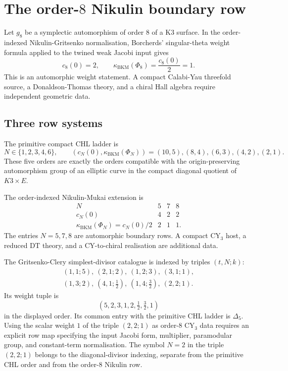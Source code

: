 \providecommand{\ZZ}{\mathbb{Z}}
\providecommand{\CC}{\mathbb{C}}
\providecommand{\cO}{\mathcal{O}}
\providecommand{\Kum}{\mathrm{Kum}}
\providecommand{\DT}{\mathrm{DT}}
\providecommand{\Eone}{E_1}
\providecommand{\Etwo}{E_2}
\providecommand{\kBKM}{\kappa_{\mathrm{BKM}}}
\providecommand{\kch}{\kappa_{\mathrm{ch}}}
\providecommand{\kcat}{\kappa_{\mathrm{cat}}}
\providecommand{\kfib}{\kappa_{\mathrm{fiber}}}
\providecommand{\PhiN}{\Phi_N}

\section*{The order-$8$ Nikulin boundary row}

Let $g_8$ be a symplectic automorphism of order $8$ of a K3 surface.
In the order-indexed Nikulin-Gritsenko normalisation, Borcherds'
singular-theta weight formula applied to the twined weak Jacobi input
gives
\[
  c_8(0)=2,\qquad \kBKM(\Phi_8)=\frac{c_8(0)}{2}=1.
\]
This is an automorphic weight statement. A compact Calabi-Yau threefold
source, a Donaldson-Thomas theory, and a chiral Hall algebra require
independent geometric data.

\subsection*{Three row systems}

The primitive compact CHL ladder is
\[
  N \in \{1,2,3,4,6\},
  \qquad
  (c_N(0),\kBKM(\Phi_N))
  =
  (10,5),(8,4),(6,3),(4,2),(2,1).
\]
These five orders are exactly the orders compatible with the
origin-preserving automorphism group of an elliptic curve in the compact
diagonal quotient of $K3\times E$.

The order-indexed Nikulin-Mukai extension is
\[
\begin{array}{c|ccc}
N & 5 & 7 & 8\\ \hline
c_N(0) & 4 & 2 & 2\\
\kBKM(\Phi_N)=c_N(0)/2 & 2 & 1 & 1 .
\end{array}
\]
The entries $N=5,7,8$ are automorphic boundary rows. A compact
CY$_3$ host, a reduced $\DT$ theory, and a CY-to-chiral realisation are
additional data.

The Gritsenko-Clery simplest-divisor catalogue is indexed by triples
$(t,N;k)$:
\[
\begin{gathered}
 (1,1;5),\ (2,1;2),\ (1,2;3),\ (3,1;1),\\
 (1,3;2),\ (4,1;\tfrac12),\ (1,4;\tfrac32),\ (2,2;1).
\end{gathered}
\]
Its weight tuple is
\[
  (5,2,3,1,2,\tfrac12,\tfrac32,1)
\]
in the displayed order. Its common entry with the primitive CHL ladder
is $\Delta_5$. Using the scalar weight $1$ of the triple
$(2,2;1)$ as order-$8$ CY$_3$ data requires an explicit row map
specifying the input Jacobi form, multiplier, paramodular group, and
constant-term normalisation. The symbol \(N=2\) in the triple
$(2,2;1)$ belongs to the diagonal-divisor indexing, separate from the
primitive CHL order and from the order-$8$ Nikulin row.

